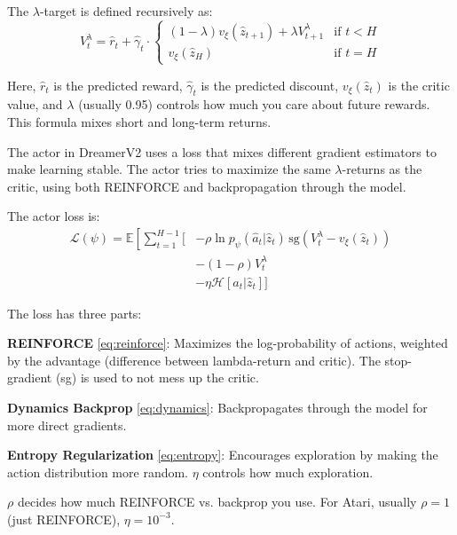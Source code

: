 \documentclass[
	english,
	ruledheaders=section,
	class=report,
	thesis={type=master},
	accentcolor=9c,
	custommargins=true,
	marginpar=false,
	parskip=half-,
	fontsize=11pt,
	pdfa=true,
]{tudapub}
\begin{document}
The $\lambda$-target is defined recursively as:
\begin{equation}
	V^{\lambda}_t = \hat{r}_t + \hat{\gamma}_t \cdot \begin{cases}
		(1 - \lambda)v_\xi(\hat{z}_{t+1}) + \lambda V^{\lambda}_{t+1} & \text{if } t < H \\
		v_\xi(\hat{z}_H)                                              & \text{if } t = H
	\end{cases}
\end{equation}

Here, $\hat{r}_t$ is the predicted reward, $\hat{\gamma}_t$ is the predicted
discount, $v_\xi(\hat{z}_t)$ is the critic value, and $\lambda$ (usually 0.95)
controls how much you care about future rewards. This formula mixes short and
long-term returns.

The actor in DreamerV2 uses a loss that mixes different gradient estimators to
make learning stable. The actor tries to maximize the same $\lambda$-returns as
the critic, using both REINFORCE and backpropagation through the model.

The actor loss is:
\begin{align}
	\mathcal{L}(\psi) = \mathbb{E}\left[\sum_{t=1}^{H-1} \Big[\right. & -\rho \ln p_\psi(\hat{a}_t | \hat{z}_t) \, \text{sg}(V^{\lambda}_t - v_\xi(\hat{z}_t)) \label{eq:reinforce} \\
	                                                                  & -(1-\rho)V^{\lambda}_t \label{eq:dynamics}                                                                  \\
	                                                                  & -\eta \mathcal{H}[a_t|\hat{z}_t] \Big] \label{eq:entropy}
\end{align}

The loss has three parts:

\textbf{REINFORCE} \eqref{eq:reinforce}: Maximizes the log-probability of actions, weighted by the advantage (difference between lambda-return and critic). The stop-gradient (sg) is used to not mess up the critic.

\textbf{Dynamics Backprop} \eqref{eq:dynamics}: Backpropagates through the model for more direct gradients.

\textbf{Entropy Regularization} \eqref{eq:entropy}: Encourages exploration by making the action distribution more random. $\eta$ controls how much exploration.

$\rho$ decides how much REINFORCE vs. backprop you use. For Atari, usually $\rho=1$ (just REINFORCE), $\eta=10^{-3}$.
\end{document}
